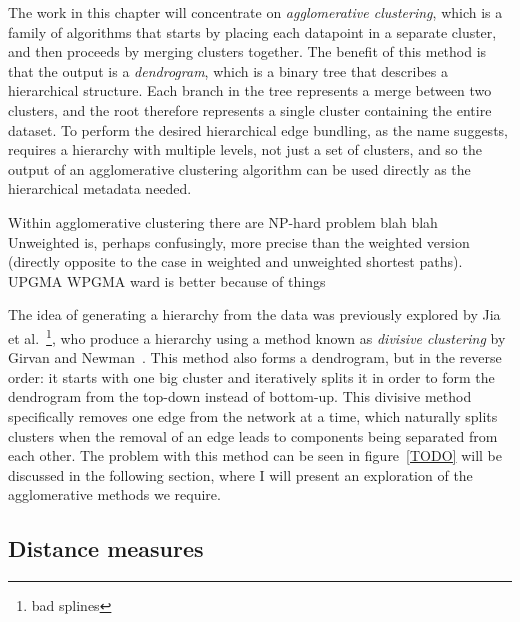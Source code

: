 The work in this chapter will concentrate on \textit{agglomerative clustering}, which is a family of algorithms that starts by placing each datapoint in a separate cluster, and then proceeds by merging clusters together. 
The benefit of this method is that the output is a \textit{dendrogram}, which is a binary tree that describes a hierarchical structure. Each branch in the tree represents a merge between two clusters, and the root therefore represents a single cluster containing the entire dataset. To perform the desired hierarchical edge bundling, as the name suggests, requires a hierarchy with multiple levels, not just a set of clusters, and so the output of an agglomerative clustering algorithm can be used directly as the hierarchical metadata needed.

Within agglomerative clustering there are 
NP-hard problem blah blah
Unweighted is, perhaps confusingly, more precise than the weighted version (directly opposite to the case in weighted and unweighted shortest paths). 
UPGMA WPGMA ward is better because of things


The idea of generating a hierarchy from the data was previously explored by Jia et al.~\cite{TODO}\footnote{bad splines}, who produce a hierarchy using a method known as \textit{divisive clustering} by Girvan and Newman~\cite{TODO}. This method also forms a dendrogram, but in the reverse order: it starts with one big cluster and iteratively splits it in order to form the dendrogram from the top-down instead of bottom-up. This divisive method specifically removes one edge from the network at a time, which naturally splits clusters when the removal of an edge leads to components being separated from each other. The problem with this method can be seen in figure~\ref{TODO} will be discussed in the following section, where I will present an exploration of the agglomerative methods we require. 

\subsection{Distance measures}

